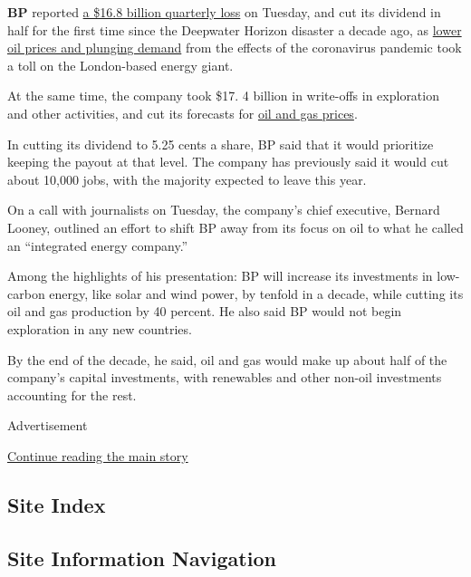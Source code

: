 \textbf{BP} reported
\href{https://www.nytimes3xbfgragh.onion/2020/08/04/business/energy-environment/bp-renewable-investment.html}{a
\$16.8 billion quarterly loss} on Tuesday, and cut its dividend in half
for the first time since the Deepwater Horizon disaster a decade ago, as
\href{https://www.nytimes3xbfgragh.onion/2020/07/30/business/shell-and-total-report-big-drop-in-profits-but-made-clean-energy-investments.html}{lower
oil prices and plunging demand} from the effects of the coronavirus
pandemic took a toll on the London-based energy giant.

At the same time, the company took \$17. 4 billion in write-offs in
exploration and other activities, and cut its forecasts for
\href{https://www.nytimes3xbfgragh.onion/live/2020/07/15/business/stock-market-today-coronavirus/opec-russia-and-other-oil-producers-will-ease-production-cuts}{oil
and gas prices}.

In cutting its dividend to 5.25 cents a share, BP said that it would
prioritize keeping the payout at that level. The company has previously
said it would cut about 10,000 jobs, with the majority expected to leave
this year.

On a call with journalists on Tuesday, the company's chief executive,
Bernard Looney, outlined an effort to shift BP away from its focus on
oil to what he called an ``integrated energy company.''

Among the highlights of his presentation: BP will increase its
investments in low-carbon energy, like solar and wind power, by tenfold
in a decade, while cutting its oil and gas production by 40 percent. He
also said BP would not begin exploration in any new countries.

By the end of the decade, he said, oil and gas would make up about half
of the company's capital investments, with renewables and other non-oil
investments accounting for the rest.

Advertisement

\protect\hyperlink{after-bottom}{Continue reading the main story}

\hypertarget{site-index}{%
\subsection{Site Index}\label{site-index}}

\hypertarget{site-information-navigation}{%
\subsection{Site Information
Navigation}\label{site-information-navigation}}

